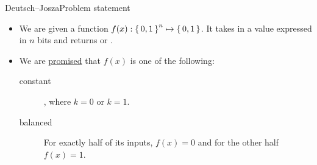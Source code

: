 \begin{frame}{Deutsch--Josza}{Problem statement}
\begin{itemize}[<+->]
    \item We are given a function $f(x): \left\{\,0,1\,\right\}^{n}\mapsto \left\{\,0,1\,\right\}$.  It takes in a value expressed in $n$ bits and returns \True{} or \False{}.
    \item We are \href{https://en.wikipedia.org/wiki/Promise_problem}{promised} that $f(x)$ is one of the following:
    \begin{description}
        \item[constant]  , where $k=0$ or $k=1$.
        \item[balanced]  For exactly half of its inputs, $f(x) = 0$ and for the other half $f(x) = 1$.
    \end{description}
\end{itemize}
\end{frame}

